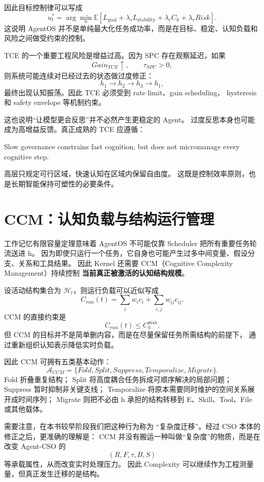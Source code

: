 因此目标控制律可以写成
\[
u_t^\ast
=
\arg\min_u
\mathbb E
\left[
L_{\mathrm{goal}}
+
\lambda_s L_{\mathrm{stability}}
+
\lambda_c C_h
+
\lambda_r Risk
\right].
\]
这说明 AgentOS 并不是单纯最大化任务成功率，而是在目标、稳定、认知负载和风险之间做受约束的控制。

TCE 的一个重要工程风险是增益过高。因为 SPC 存在观察延迟，如果
\[
Gain_{TCE}\uparrow,
\qquad
\tau_{SPC}>0,
\]
则系统可能连续对已经过去的状态做过度修正：
\[
h_1\rightarrow h_2\rightarrow h_3\rightarrow h_1,
\]
最终出现认知振荡。因此 TCE 必须受到 rate limit、gain scheduling、
hysteresis 和 safety envelope 等机制约束。

这也说明``让模型更会反思''并不必然产生更稳定的 Agent。
过度反思本身也可能成为高增益反馈。真正成熟的 TCE 应遵循：
\begin{statementbox}
Slow governance constrains fast cognition,
but does not micromanage every cognitive step.
\end{statementbox}
高层只规定可行区域，快速认知在区域内保留自由度。
这既是控制效率原则，也是长期智能保持可塑性的必要条件。


\section{CCM：认知负载与结构运行管理}

工作记忆有限容量定理意味着 AgentOS 不可能仅靠 Scheduler 把所有重要任务轮流送进 h。
因为即使只运行一个任务，它自身也可能产生过多中间变量、假设分支、关系和工具结果。
因此 Kernel 还需要 CCM（Cognitive Complexity Management）持续控制
\textbf{当前真正被激活的认知结构规模}。

设活动结构集合为 $\mathcal H_t$，则运行负载可以近似写成
\[
C_{run}(t)
=
\sum_i w_i c_i
+
\sum_{i,j}w_{ij}c_{ij}.
\]
CCM 的直接约束是
\[
\boxed{
C_{run}(t)\leq C_h^{\max}.
}
\]
但 CCM 的目标并不是简单删内容，而是在尽量保留任务所需结构的前提下，
通过重新组织认知表示降低实时负载。

因此 CCM 可拥有五类基本动作：
\[
\mathcal A_{CCM}
=
\{
Fold,
Split,
Suppress,
Temporalize,
Migrate
\}.
\]
Fold 折叠重复结构；
Split 将高度耦合任务拆成可顺序解决的局部问题；
Suppress 暂时抑制非关键支线；
Temporalize 将原本需要同时维护的空间关系展开成时间序列；
Migrate 则把不必由 h 承担的结构转移到 E、Skill、Tool、File 或其他载体。

需要注意，在本书较早阶段我们把这种行为称为
``复杂度迁移''。经过 CSO 本体的修正之后，更准确的理解是：
CCM 并没有搬运一种叫做``复杂度''的物质，而是在改变 Agent-CSO 的
\[
(R,F,\tau,B,S)
\]
等承载属性，从而改变实时处理压力。
因此 Complexity 可以继续作为工程测量量，但真正发生迁移的是结构。

